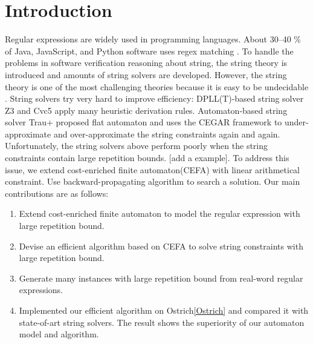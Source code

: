 \documentclass[runningheads]{llncs}
\begin{document}
\section{Introduction}
Regular expressions are widely used in programming languages. About 30–40 \% of Java, JavaScript, and Python software uses regex matching \cite{redos_fse2019}. To handle the problems in software verification reasoning about string, the string theory is introduced and amounts of string solvers are developed.
However, the string theory is one of the most challenging theories because it is easy to be undecidable \cite{undecidable_2016}.
String solvers try very hard to improve efficiency:  DPLL(T)-based string solver Z3 \cite{z3} and Cvc5 \cite{cvc5} apply many heuristic derivation rules. Automaton-based string solver Trau+\cite{trau} proposed flat automaton and uses the CEGAR framework to under-approximate
and over-approximate the string constraints again and again.
Unfortunately, the string solvers above perform poorly when the string constraints contain large repetition bounds. [add a example]. To address this issue, we extend cost-enriched finite automaton(CEFA)\cite{atva2020} with linear arithmetical constraint. Use backward-propagating algorithm to search a solution. Our main contributions are as follows: 
\begin{enumerate}
  \item  Extend cost-enriched finite automaton to model the regular expression with large repetition bound.
  \item  Devise an efficient algorithm based on CEFA to solve string constraints with large repetition bound.
  \item  Generate many instances with large repetition bound from real-word regular expressions.
  \item  Implemented our efficient algorithm on Ostrich\ref{Ostrich} and compared it with state-of-art string solvers. The result shows the superiority of our automaton model and algorithm.
\end{enumerate}
\end{document}
